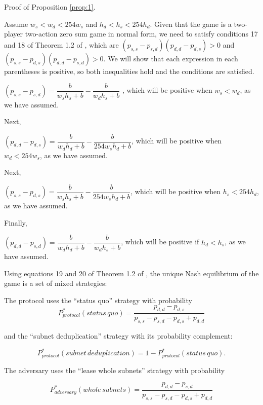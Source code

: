 \documentclass[english]{mrl}
\makeatletter
\theoremstyle{plain}
\newenvironment{proof}[1][\proofname]{\par
    \normalfont\topsep6\p@\@plus6\p@\relax
    \trivlist
    \itemindent\parindent
    \item[\hskip\labelsep
          \scshape
      #1]\ignorespaces
  }{%
    \endtrivlist\@endpefalse
  }
\providecommand{\proofname}{Proof}
\makeatother
\begin{document}
Proof of Proposition \ref{prop:1}.
\begin{proof}
Assume $w_{s}<w_{d}<254w_{s}$ and $h_{d}<h_{s}<254h_{d}$. Given
that the game is a two-player two-action zero sum game in normal form,
we need to satisfy conditions 17 and 18 of Theorem 1.2 of \cite{sun:hal-03852615},
which are $\left(p_{s,s}-p_{s,d}\right)\left(p_{d,d}-p_{d,s}\right)>0$
and $\left(p_{s,s}-p_{d,s}\right)\left(p_{d,d}-p_{s,d}\right)>0$.
We will show that each expression in each parentheses is positive,
so both inequalities hold and the conditions are satisfied.

$\left(p_{s,s}-p_{s,d}\right)=\dfrac{b}{w_{s}h_{s}+b}-\dfrac{b}{w_{d}h_{s}+b}$
, which will be positive when $w_{s}<w_{d}$, as we have assumed.

Next,

$\left(p_{d,d}-p_{d,s}\right)=\dfrac{b}{w_{d}h_{d}+b}-\dfrac{b}{254w_{s}h_{d}+b}$,
which will be positive when $w_{d}<254w_{s}$, as we have assumed.

Next,

$\left(p_{s,s}-p_{d,s}\right)=\dfrac{b}{w_{s}h_{s}+b}-\dfrac{b}{254w_{s}h_{d}+b}$,
which will be positive when $h_{s}<254h_{d}$, as we have assumed.

Finally,

$\left(p_{d,d}-p_{s,d}\right)=\dfrac{b}{w_{d}h_{d}+b}-\dfrac{b}{w_{d}h_{s}+b}$,
which will be positive if $h_{d}<h_{s}$, as we have assumed.

Using equations 19 and 20 of Theorem 1.2 of \cite{sun:hal-03852615},
the unique Nash equilibrium of the game is a set of mixed strategies:

The protocol uses the ``status quo'' strategy with probability
\begin{equation}
P_{protocol}^{*}(status\,quo)=\dfrac{p_{d,d}-p_{d,s}}{p_{s,s}-p_{s,d}-p_{d,s}+p_{d,d}}
\end{equation}

and the ``subnet deduplication'' strategy with its probability complement:

\begin{equation}
P_{protocol}^{*}(subnet\,deduplication)=1-P_{protocol}^{*}(status\,quo).
\end{equation}

The adversary uses the ``lease whole subnets'' strategy with probability

\begin{equation}
P_{adversary}^{*}(whole\,subnets)=\dfrac{p_{d,d}-p_{s,d}}{p_{s,s}-p_{s,d}-p_{d,s}+p_{d,d}}
\end{equation}


\end{proof}
\end{document}
